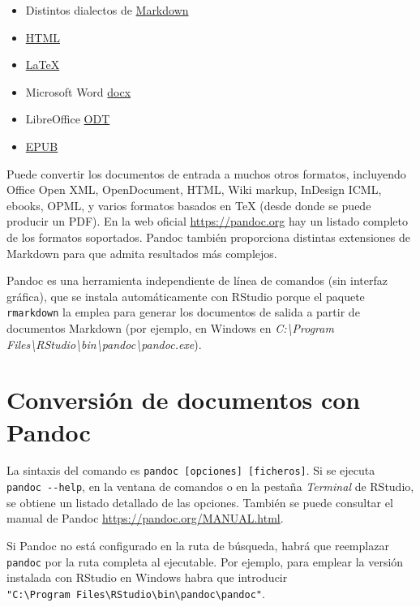 \documentclass[
]{book}
\theoremstyle{break}
\theoremstyle{nonumberplain}
\begin{document}
\begin{itemize}
\item
  Distintos dialectos de \href{http://daringfireball.net/projects/markdown/}{Markdown}
\item
  \href{http://www.w3.org/TR/html40/}{HTML}
\item
  \href{http://www.latex-project.org/}{LaTeX}
\item
  Microsoft Word \href{https://en.wikipedia.org/wiki/Office_Open_XML}{docx}
\item
  LibreOffice \href{http://en.wikipedia.org/wiki/OpenDocument}{ODT}
\item
  \href{http://en.wikipedia.org/wiki/EPUB}{EPUB}
\end{itemize}

Puede convertir los documentos de entrada a muchos otros formatos, incluyendo Office Open XML, OpenDocument, HTML, Wiki markup, InDesign ICML, ebooks, OPML, y varios formatos basados en TeX (desde donde se puede producir un PDF).
En la web oficial \url{https://pandoc.org} hay un listado completo de los formatos soportados.
Pandoc también proporciona distintas extensiones de Markdown para que admita resultados más complejos.

Pandoc es una herramienta independiente de línea de comandos (sin interfaz gráfica), que se instala automáticamente con RStudio porque el paquete \texttt{rmarkdown} la emplea para generar los documentos de salida a partir de documentos Markdown
(por ejemplo, en Windows en \emph{C:\textbackslash Program Files\textbackslash RStudio\textbackslash bin\textbackslash pandoc\textbackslash pandoc.exe}).

\hypertarget{conversion}{%
\section{Conversión de documentos con Pandoc}\label{conversion}}

La sintaxis del comando es \texttt{pandoc\ {[}opciones{]}\ {[}ficheros{]}}. Si se ejecuta \texttt{pandoc\ -\/-help},
en la ventana de comandos o en la pestaña \emph{Terminal} de RStudio, se obtiene un listado detallado de las opciones.
También se puede consultar el manual de Pandoc \url{https://pandoc.org/MANUAL.html}.

Si Pandoc no está configurado en la ruta de búsqueda, habrá que reemplazar \texttt{pandoc} por la ruta completa al ejecutable.
Por ejemplo, para emplear la versión instalada con RStudio en Windows habra que introducir \texttt{"C:\textbackslash{}Program\ Files\textbackslash{}RStudio\textbackslash{}bin\textbackslash{}pandoc\textbackslash{}pandoc"}.
\end{document}
